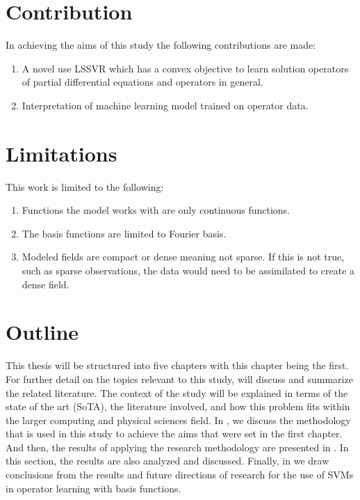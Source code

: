 \section{Contribution}
\noindent In achieving the aims of this study the following contributions are made:
\begin{enumerate}
    \item A novel use LSSVR which has a convex objective to learn solution operators of partial differential equations and operators in general.
    \item Interpretation of machine learning model trained on operator data.
\end{enumerate}

\section{Limitations}
\noindent This work is limited to the following:
\begin{enumerate}
    \item Functions the model works with are only continuous functions.
    \item The basis functions are limited to Fourier basis.
    \item Modeled fields are compact or dense meaning not sparse. If this is not true, such as sparse observations, the data would need to be assimilated to create a dense field.
\end{enumerate}

\section{Outline}
\noindent This thesis will be structured into five chapters with this chapter being the first. For further detail on the topics relevant to this study,  will discuss and summarize the related literature. The context of the study will be explained in terms of the state of the art (SoTA), the literature involved, and how this problem fits within the larger computing and physical sciences field. In , we discuss the methodology that is used in this study to achieve the aims that were set in the first chapter. And then, the results of applying the research methodology are presented in . In this section, the results are also analyzed and discussed. Finally, in  we draw conclusions from the results and future directions of research for the use of SVMs in operator learning with basis functions.

